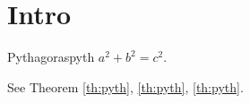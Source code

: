 \documentclass{article}
\begin{document}
\section{Intro}
\begin{mytheo}{Pythagoras}{pyth}
$a^2+b^2=c^2$.
\end{mytheo}
See Theorem \ref{th:pyth}, \autoref{th:pyth}, \cref{th:pyth}.
\end{document}
